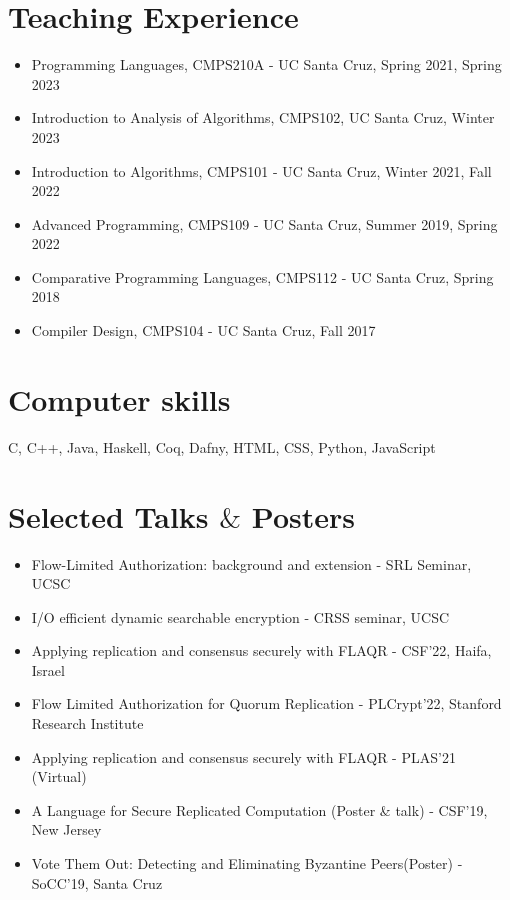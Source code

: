 \documentclass[9pt,a4paper]{moderncv}
\begin{document}
\section{Teaching Experience}
\begin{itemize}
\item Programming Languages, CMPS210A - UC Santa Cruz, Spring 2021, Spring 2023 
\item Introduction to Analysis of Algorithms, CMPS102, UC Santa Cruz, Winter 2023
\item Introduction to Algorithms, CMPS101 - UC Santa Cruz, Winter 2021, Fall 2022
\item Advanced Programming, CMPS109 - UC Santa Cruz, Summer 2019, Spring 2022
\item Comparative Programming Languages, CMPS112 - UC Santa Cruz, Spring 2018
\item Compiler Design, CMPS104 - UC Santa Cruz, Fall 2017
\end{itemize}
\section{Computer skills}
\hspace{-0.1cm} {C, C++, Java, Haskell, Coq, Dafny, HTML, CSS, Python, JavaScript}
\hspace{-0.1cm}
\section{Selected Talks $\&$ Posters}
\begin{itemize}
\item Flow-Limited Authorization: background and extension - SRL Seminar, UCSC
\item I/O efficient dynamic searchable encryption - CRSS seminar, UCSC
\item Applying replication and consensus securely with FLAQR - CSF'22, Haifa, Israel
\item Flow Limited Authorization for Quorum Replication - PLCrypt'22, Stanford Research Institute
\item Applying replication and consensus securely with FLAQR - PLAS'21 (Virtual)%
\item A Language for Secure Replicated Computation (Poster \& talk) - CSF'19, New Jersey
\item Vote Them Out: Detecting and Eliminating Byzantine Peers(Poster) - SoCC'19, Santa Cruz 
\end{itemize}
\end{document}

